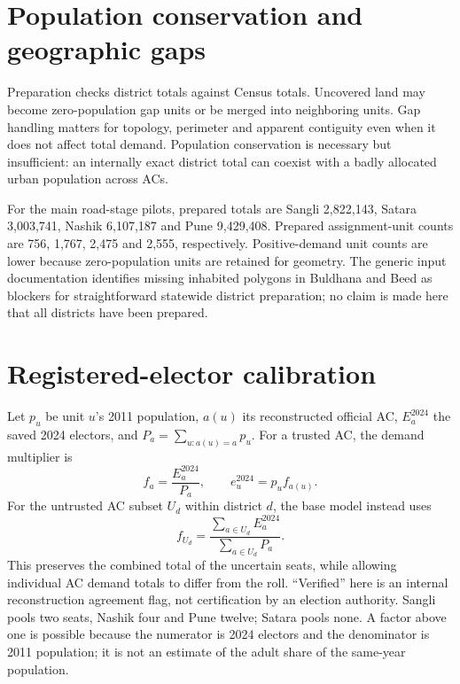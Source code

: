 \documentclass[11pt,a4paper,oneside]{report}
\newcommand{\source}[1]{\par\nopagebreak[4]{\footnotesize\color{teal}Evidence: #1.}\par}
\begin{document}
\section{Population conservation and geographic gaps}
Preparation checks district totals against Census totals. Uncovered land may become zero-population gap units or be merged into neighboring units. Gap handling matters for topology, perimeter and apparent contiguity even when it does not affect total demand. Population conservation is necessary but insufficient: an internally exact district total can coexist with a badly allocated urban population across ACs.

For the main road-stage pilots, prepared totals are Sangli 2,822,143, Satara 3,003,741, Nashik 6,107,187 and Pune 9,429,408. Prepared assignment-unit counts are 756, 1,767, 2,475 and 2,555, respectively. Positive-demand unit counts are lower because zero-population units are retained for geometry. The generic input documentation identifies missing inhabited polygons in Buldhana and Beed as blockers for straightforward statewide district preparation; no claim is made here that all districts have been prepared.
\source{[S4]}

\section{Registered-elector calibration}
Let $p_u$ be unit $u$'s 2011 population, $a(u)$ its reconstructed official AC, $E_a^{2024}$ the saved 2024 electors, and $P_a=\sum_{u:a(u)=a}p_u$. For a trusted AC, the demand multiplier is
\begin{equation}
 f_a=\frac{E_a^{2024}}{P_a},\qquad e_u^{2024}=p_u f_{a(u)}.
\end{equation}
For the untrusted AC subset $U_d$ within district $d$, the base model instead uses
\begin{equation}
 f_{U_d}=\frac{\sum_{a\in U_d}E_a^{2024}}{\sum_{a\in U_d}P_a}.
\end{equation}
This preserves the combined total of the uncertain seats, while allowing individual AC demand totals to differ from the roll. ``Verified'' here is an internal reconstruction agreement flag, not certification by an election authority. Sangli pools two seats, Nashik four and Pune twelve; Satara pools none. A factor above one is possible because the numerator is 2024 electors and the denominator is 2011 population; it is not an estimate of the adult share of the same-year population.
\end{document}
